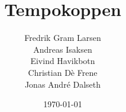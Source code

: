 \newcommand{\kopp}{Tempokoppen}
\newcommand{\mytitle}{\kopp}
\newcommand{\mygroupnumber}{59}
\newcommand{\myauthor}{Fredrik Gram Larsen\\Andreas Isaksen\\Eivind Havikbotn\\Christian Dè Frene\\Jonas André Dalseth}

\title{\mytitle}
\author{\myauthor}
\date{\today}
